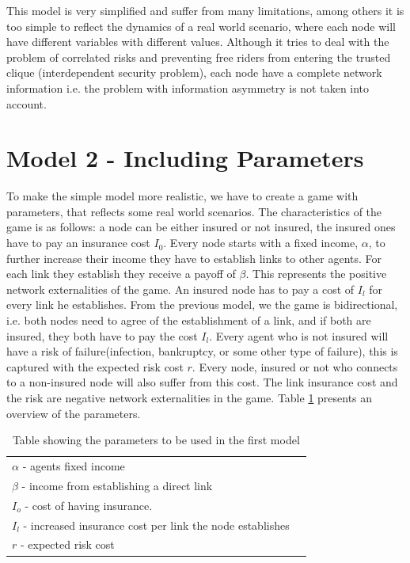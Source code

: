 This model is very simplified and suffer from many limitations, among others it is too simple to reflect the dynamics of a real world scenario, where each node will have different variables with different values. Although it tries to deal with the problem of correlated risks and preventing free riders from entering the trusted clique (interdependent security problem), each node have a complete network information i.e. the problem with information asymmetry is not taken into account. 

\section{Model 2 - Including Parameters}
To make the simple model more realistic, we have to create a game with parameters, that reflects some real world scenarios. The characteristics of the game is as follows: a node can be either insured or not insured, the insured ones have to pay an insurance cost $I_{0}$. Every node starts with a fixed income, $\alpha$, to further increase their income they have to establish links to other agents. For each link they establish they receive a payoff of $\beta$. This represents the positive network externalities of the game. An insured node has to pay a cost of $I_{l}$ for every link he establishes. From the previous model, we the game is bidirectional, i.e. both nodes need to agree of the establishment of a link, and if both are insured, they both have to pay the cost $I_{l}$. 
Every agent who is not insured will have a risk of failure(infection, bankruptcy, or some other type of failure), this is captured with the expected risk cost $r$. Every node, insured or not who connects to a non-insured node will also suffer from this cost. The link insurance cost and the risk are negative network externalities in the game. Table \ref{tbl:simplegamepara} presents an overview of the parameters. 
\begin{table}[h]
\centering
\begin{tabular}{lc}
 \hline
  $\alpha$ - agents fixed income\\
  $\beta$ - income from establishing a direct link \\
  $I_{o}$ - cost of having insurance. \\
  $I_{l}$ - increased insurance cost per link the node establishes\\
  $r$ - expected risk cost\\
  \hline
\end{tabular}
\caption{Table showing the parameters to be used in the first model \label{tbl:simplegamepara}}
\end{table}
